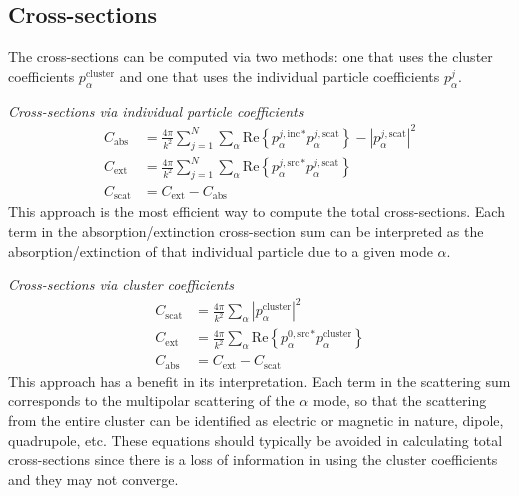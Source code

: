 \documentclass[11pt]{article}
\begin{document}
\subsection{Cross-sections}

The cross-sections can be computed via two methods: one that uses the cluster coefficients $p_\alpha^\text{cluster}$ and one that uses the individual particle coefficients $p_\alpha^j$.

\hfill

\textit{Cross-sections via individual particle coefficients}
\begin{subequations}
\begin{align}
    C_\text{abs} &= \frac{4\pi}{k^2} \sum_{j=1}^N \sum_{\alpha}
        \text{Re} \left\{p_\alpha^{j,\text{inc}}^* p_\alpha^{j,\text{scat}} \right\} 
        - |p_\alpha^{j,\text{scat}}|^2\\
    C_\text{ext} &= \frac{4\pi}{k^2} \sum_{j=1}^N \sum_{\alpha}
        \text{Re} \left\{p_\alpha^{j,\text{src}}^* p_\alpha^{j,\text{scat}} \right\} \\
    C_\text{scat} &= C_\text{ext} - C_\text{abs}
\end{align}
\label{eqn:cross_sections}
\end{subequations}
This approach is the most efficient way to compute the total cross-sections.
Each term in the absorption/extinction cross-section sum can be interpreted as the absorption/extinction of that individual particle due to a given mode $\alpha$.

\hfill

\textit{Cross-sections via cluster coefficients} \cite{xu1995electromagnetic}
\begin{subequations}
\begin{align}
    C_\text{scat} &= \frac{4\pi}{k^2} \sum_{\alpha}
        |p_{\alpha}^\text{cluster}|^2 \\
    C_\text{ext} &= \frac{4\pi}{k^2} \sum_{\alpha}
    \text{Re} \left\{ p_\alpha^{0,\text{src}}^* p_\alpha^\text{cluster} \right\} \\
    C_\text{abs} &= C_\text{ext} - C_\text{scat}
\end{align}
\end{subequations}
This approach has a benefit in its interpretation.
Each term in the scattering sum corresponds to the multipolar scattering of the  $\alpha$ mode, so that the scattering from the entire cluster can be identified as electric or magnetic in nature, dipole, quadrupole, etc.
These equations should typically be avoided in calculating total cross-sections since there is a loss of information in using the cluster coefficients and they may not converge.
\end{document}
